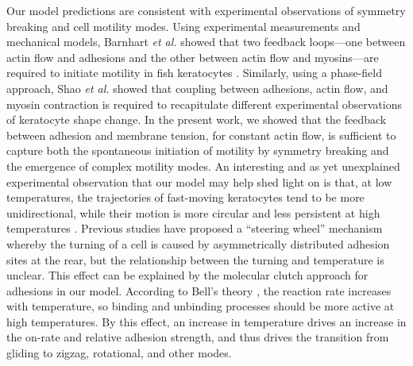 \documentclass[12pt]{article}
\begin{document}
        Our model predictions are consistent with experimental observations of symmetry breaking and cell motility modes. 
        Using experimental measurements and mechanical models, Barnhart \textit{et al.} showed that two feedback loops---one between actin flow and adhesions and the other between actin flow and myosins---are required to initiate motility in fish keratocytes \cite{barnhart2015balance}.
        Similarly, using a phase-field approach, Shao \textit{et al.} \cite{shao2012coupling} showed that coupling between adhesions, actin flow, and myosin contraction is required to recapitulate different experimental observations of keratocyte shape change. 
        In the present work, we showed that the feedback between adhesion and membrane tension, for constant actin flow, is sufficient to capture both the spontaneous initiation of motility by symmetry breaking and the emergence of complex motility modes.
        An interesting and as yet unexplained experimental observation that our model may help shed light on is that, at low temperatures, the trajectories of fast-moving keratocytes tend to be more unidirectional, while their motion is more circular and less persistent at high temperatures \cite{mogilner2020experiment}. 
        Previous studies have proposed a ``steering wheel'' mechanism \cite{allen2020cell,lee2020modeling} whereby the turning of a cell is caused by asymmetrically distributed adhesion sites at the rear, but the relationship between the turning and temperature is unclear. 
        This effect can be explained by the molecular clutch approach for adhesions in our model. 
        According to Bell's theory \cite{bell1978models}, the reaction rate increases with temperature, so binding and unbinding processes should be more active at high temperatures. By this effect, an increase in temperature drives an increase in the on-rate and relative adhesion strength, and thus drives the transition from gliding to zigzag, rotational, and other modes. 
        
\end{document}
